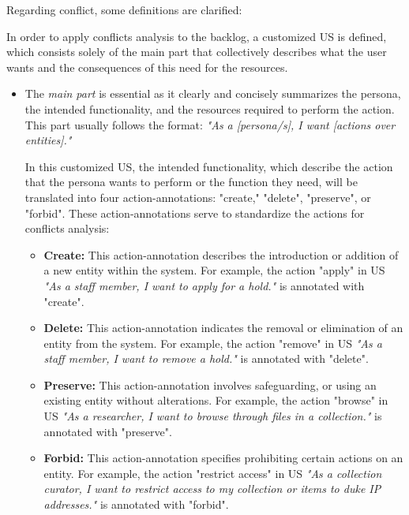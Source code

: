 Regarding conflict, some definitions are clarified:
\begin{definition}
	In order to apply conflicts analysis to the backlog, a customized US is defined, which consists solely of the main part that collectively describes what the user wants and the consequences of this need for the resources.
\begin{itemize}
	\item The \textit{main part} is essential as it clearly and concisely summarizes the persona, the intended functionality, and the resources required to perform the action. This part usually follows the format: \textit{"As a [persona/s], I want [actions over entities]."}
	
	In this customized US, the intended functionality, which describe the action that the persona wants to perform or the function they need, will be translated into four action-annotations: "create," "delete", "preserve", or "forbid". These action-annotations serve to standardize the actions for conflicts analysis:
	
	\begin{itemize}
		\item \textbf{Create:} This action-annotation describes the introduction or addition of a new entity within the system. For example, the action "apply" in US \textit{"As a staff member, I want to apply for a hold."} is annotated with "create".
		
		\item \textbf{Delete:} This action-annotation indicates the removal or elimination of an entity from the system. For example, the action "remove" in US \textit{"As a staff member, I want to remove a hold."} is annotated with "delete".
		
		\item \textbf{Preserve:} This action-annotation involves safeguarding, or using an existing entity without alterations. For example, the action "browse" in US \textit{"As a researcher, I want to browse through files in a collection."} is annotated with "preserve".
		
		\item \textbf{Forbid:} This action-annotation specifies prohibiting certain actions on an entity. For example, the action "restrict access" in US \textit{"As a collection curator, I want to restrict access to my collection or items to duke IP addresses."} is annotated with "forbid".
	\end{itemize}
	

\end{itemize}
\end{definition}
